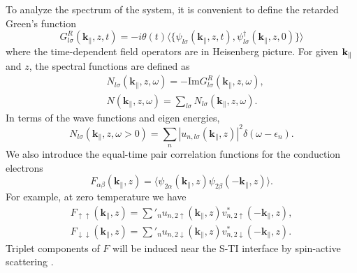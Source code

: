 To analyze the spectrum of the system, it is convenient to define the retarded Green's function
\begin{equation}
G^R_{l\sigma}(\mathbf{k}_\parallel,z,t)=-i\theta(t)\langle \{\psi_{l\sigma}(\mathbf{k}_\parallel,z,t),
\psi^\dagger_{l\sigma}(\mathbf{k}_\parallel,z,0)\}\rangle
\end{equation}
where the time-dependent field operators are in Heisenberg picture. 
For given $\mathbf{k}_\parallel$ and $z$, the spectral functions 
are defined as
\begin{align}
&N_{l\sigma}(\mathbf{k}_\parallel,z,\omega)= -\mathrm{Im}G^R_{l\sigma}(\mathbf{k}_\parallel,z,\omega), \\
&N(\mathbf{k}_\parallel,z,\omega)=\sum_{l\sigma}N_{l\sigma}(\mathbf{k}_\parallel,z,\omega).
\end{align}
In terms of the wave functions and eigen energies, 
\begin{equation}
N_{l\sigma}(\mathbf{k}_\parallel,z,\omega>0)=\sum_n|u_{n,l\sigma}(\mathbf{k}_\parallel,z)|^2\delta(\omega-\epsilon_n). 
\end{equation}
We also introduce the equal-time pair correlation functions
for the conduction electrons 
\begin{equation}
F_{\alpha\beta}(\mathbf{k}_\parallel,z)=\langle \psi_{2\alpha}(\mathbf{k}_\parallel,z) \psi_{2\beta}(-\mathbf{k}_\parallel,z)\rangle.\label{pair-corr}
\end{equation}
For example, at zero temperature we have
\begin{align}
F_{\uparrow\uparrow}(\mathbf{k}_\parallel,z)=\sum'_n u_{n,2\uparrow}(\mathbf{k}_\parallel,z)
v^*_{n,2\uparrow}(-\mathbf{k}_\parallel,z),\\
F_{\downarrow\downarrow}(\mathbf{k}_\parallel,z)=\sum'_n u_{n,2\downarrow}(\mathbf{k}_\parallel,z)
v^*_{n,2\downarrow}(-\mathbf{k}_\parallel,z).
\end{align}
Triplet components of $F$ will be induced near the S-TI interface by spin-active
scattering \cite{zhao}.

